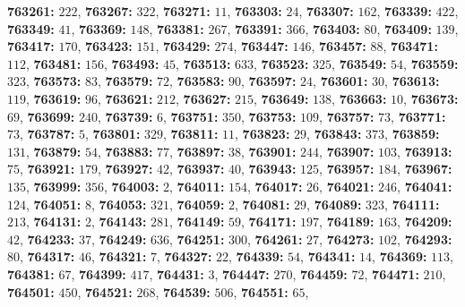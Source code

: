 \textsf{\bfseries 763261:} $222$, \textsf{\bfseries 763267:} $322$, \textsf{\bfseries 763271:} $11$, \textsf{\bfseries 763303:} $24$, \textsf{\bfseries 763307:} $162$, \textsf{\bfseries 763339:} $422$, \textsf{\bfseries 763349:} $41$, \textsf{\bfseries 763369:} $148$, \textsf{\bfseries 763381:} $267$, \textsf{\bfseries 763391:} $366$, \textsf{\bfseries 763403:} $80$, \textsf{\bfseries 763409:} $139$, \textsf{\bfseries 763417:} $170$, \textsf{\bfseries 763423:} $151$, \textsf{\bfseries 763429:} $274$, \textsf{\bfseries 763447:} $146$, \textsf{\bfseries 763457:} $88$, \textsf{\bfseries 763471:} $112$, \textsf{\bfseries 763481:} $156$, \textsf{\bfseries 763493:} $45$, \textsf{\bfseries 763513:} $633$, \textsf{\bfseries 763523:} $325$, \textsf{\bfseries 763549:} $54$, \textsf{\bfseries 763559:} $323$, \textsf{\bfseries 763573:} $83$, \textsf{\bfseries 763579:} $72$, \textsf{\bfseries 763583:} $90$, \textsf{\bfseries 763597:} $24$, \textsf{\bfseries 763601:} $30$, \textsf{\bfseries 763613:} $119$, \textsf{\bfseries 763619:} $96$, \textsf{\bfseries 763621:} $212$, \textsf{\bfseries 763627:} $215$, \textsf{\bfseries 763649:} $138$, \textsf{\bfseries 763663:} $10$, \textsf{\bfseries 763673:} $69$, \textsf{\bfseries 763699:} $240$, \textsf{\bfseries 763739:} $6$, \textsf{\bfseries 763751:} $350$, \textsf{\bfseries 763753:} $109$, \textsf{\bfseries 763757:} $73$, \textsf{\bfseries 763771:} $73$, \textsf{\bfseries 763787:} $5$, \textsf{\bfseries 763801:} $329$, \textsf{\bfseries 763811:} $11$, \textsf{\bfseries 763823:} $29$, \textsf{\bfseries 763843:} $373$, \textsf{\bfseries 763859:} $131$, \textsf{\bfseries 763879:} $54$, \textsf{\bfseries 763883:} $77$, \textsf{\bfseries 763897:} $38$, \textsf{\bfseries 763901:} $244$, \textsf{\bfseries 763907:} $103$, \textsf{\bfseries 763913:} $75$, \textsf{\bfseries 763921:} $179$, \textsf{\bfseries 763927:} $42$, \textsf{\bfseries 763937:} $40$, \textsf{\bfseries 763943:} $125$, \textsf{\bfseries 763957:} $184$, \textsf{\bfseries 763967:} $135$, \textsf{\bfseries 763999:} $356$, \textsf{\bfseries 764003:} $2$, \textsf{\bfseries 764011:} $154$, \textsf{\bfseries 764017:} $26$, \textsf{\bfseries 764021:} $246$, \textsf{\bfseries 764041:} $124$, \textsf{\bfseries 764051:} $8$, \textsf{\bfseries 764053:} $321$, \textsf{\bfseries 764059:} $2$, \textsf{\bfseries 764081:} $29$, \textsf{\bfseries 764089:} $323$, \textsf{\bfseries 764111:} $213$, \textsf{\bfseries 764131:} $2$, \textsf{\bfseries 764143:} $281$, \textsf{\bfseries 764149:} $59$, \textsf{\bfseries 764171:} $197$, \textsf{\bfseries 764189:} $163$, \textsf{\bfseries 764209:} $42$, \textsf{\bfseries 764233:} $37$, \textsf{\bfseries 764249:} $636$, \textsf{\bfseries 764251:} $300$, \textsf{\bfseries 764261:} $27$, \textsf{\bfseries 764273:} $102$, \textsf{\bfseries 764293:} $80$, \textsf{\bfseries 764317:} $46$, \textsf{\bfseries 764321:} $7$, \textsf{\bfseries 764327:} $22$, \textsf{\bfseries 764339:} $54$, \textsf{\bfseries 764341:} $14$, \textsf{\bfseries 764369:} $113$, \textsf{\bfseries 764381:} $67$, \textsf{\bfseries 764399:} $417$, \textsf{\bfseries 764431:} $3$, \textsf{\bfseries 764447:} $270$, \textsf{\bfseries 764459:} $72$, \textsf{\bfseries 764471:} $210$, \textsf{\bfseries 764501:} $450$, \textsf{\bfseries 764521:} $268$, \textsf{\bfseries 764539:} $506$, \textsf{\bfseries 764551:} $65$, 
